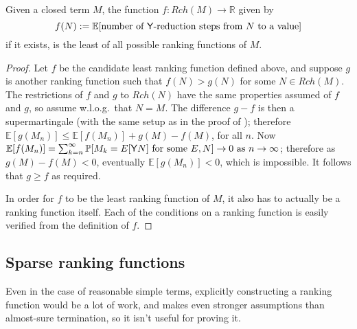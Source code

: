 \begin{theorem} \label{thm:minimal}
Given a closed term $M$, the function $f:Rch(M) \to \mathbb R$ given by 
\[
f(N) := \mathbb E [\text{number of }\mathsf{Y}\text{-reduction steps from }N\text{ to a value}]
\] 
if it exists, is the least of all possible ranking functions of $M$.
\end{theorem}
\begin{proof}
Let $f$ be the candidate least ranking function defined above, and suppose $g$ is another ranking function such that $f(N) > g(N)$ for some $N \in Rch(M)$. The restrictions of $f$ and $g$ to $Rch(N)$ have the same properties assumed of $f$ and $g$, so assume w.l.o.g.~that $N=M$. The difference $g - f$ is then a supermartingale (with the same setup as in the proof of %
);
therefore $\mathbb E[g(M_n)] \leq \mathbb E[f(M_n)] + g(M)-f(M)$, for all $n$.
Now $\mathbb E[f(M_n)] = \sum_{k=n}^\infty \mathbb P[M_k = E[\mathsf{Y} N] \text{ for some }E, N] \to 0 \text{ as } n \to \infty$; 
therefore as $g(M) - f(M) < 0$, eventually $\mathbb E[g(M_n)] < 0$, which is impossible. 
It follows that $g \geq f$ as required.

In order for $f$ to be the least ranking function of $M$, it also has to actually be a ranking function itself. Each of the conditions on a ranking function is easily verified from the definition of $f$.
\end{proof}

\subsection{Sparse ranking functions}
Even in the case of reasonable simple terms, explicitly constructing a ranking function would be a lot of work, and  makes even stronger assumptions than almost-sure termination, so it isn't useful for proving it.

